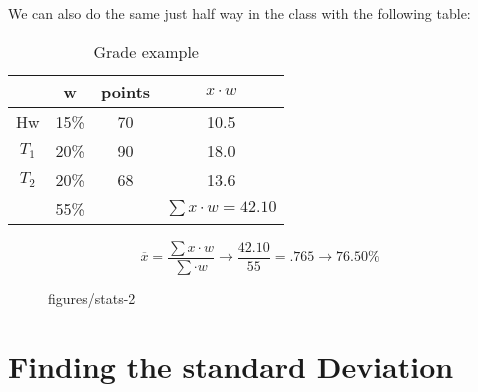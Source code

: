 \documentclass{book}
\begin{document}
We can also do the same just half way in the class with the following table:

\begin{table}[htbp]
    \centering
    \begin{tabular}{c|c|c|c}
        \toprule
              & w & points & $x\cdot w$ \\
        \midrule
        Hw & 15\% & 70 & 10.5 \\
        $T_1$ & 20\%    & 90 & 18.0 \\
        $T_2$ & 20\%    & 68 & 13.6 \\
        \midrule
            & 55\%      &    & $\sum x\cdot w = 42.10 $ \\
        \bottomrule
    \end{tabular}
    \caption{Grade example}
\end{table}
\[ \overline{x} = \frac{\sum x\cdot w}{\sum \cdot w} \to \frac{42.10}{55} = .765 \to 76.50\% \] 
    

\begin{figure}[ht]
    \centering
    \caption{figures/stats-2}
    \label{fig:stats-2}
\end{figure}

\vspace{50pt}


\section{Finding the standard Deviation}
\end{document}
